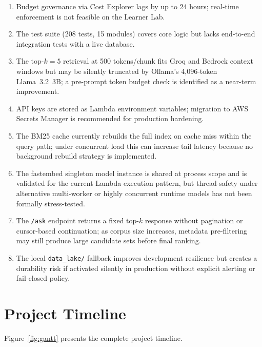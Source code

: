 \begin{enumerate}[leftmargin=0.5in]
  \item Budget governance via Cost Explorer lags by up to 24 hours; real-time enforcement is not feasible on the Learner Lab.

  \item The test suite (208 tests, 15 modules) covers core logic but lacks end-to-end integration tests with a live database.

  \item The top-$k = 5$ retrieval at 500 tokens/chunk fits Groq and Bedrock context windows but may be silently truncated by Ollama's 4{,}096-token Llama~3.2~3B; a pre-prompt token budget check is identified as a near-term improvement.

  \item API keys are stored as Lambda environment variables; migration to AWS Secrets Manager is recommended for production hardening.

  \item The BM25 cache currently rebuilds the full index on cache miss within the query path; under concurrent load this can increase tail latency because no background rebuild strategy is implemented.

  \item The fastembed singleton model instance is shared at process scope and is validated for the current Lambda execution pattern, but thread-safety under alternative multi-worker or highly concurrent runtime models has not been formally stress-tested.

  \item The \texttt{/ask} endpoint returns a fixed top-$k$ response without pagination or cursor-based continuation; as corpus size increases, metadata pre-filtering may still produce large candidate sets before final ranking.

  \item The local \texttt{data\_lake/} fallback improves development resilience but creates a durability risk if activated silently in production without explicit alerting or fail-closed policy.
\end{enumerate}

\section{Project Timeline}
\label{sec:timeline}

Figure~\ref{fig:gantt} presents the complete project timeline.

